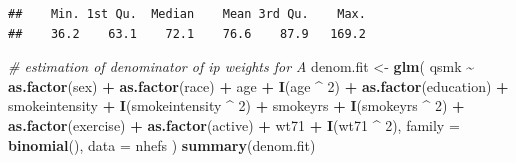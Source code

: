 \documentclass[
  10pt,
]{book}
\newenvironment{Shaded}{\begin{snugshade}}{\end{snugshade}}
\newcommand{\CommentTok}[1]{\textcolor[rgb]{0.56,0.35,0.01}{\textit{#1}}}
\newcommand{\DataTypeTok}[1]{\textcolor[rgb]{0.13,0.29,0.53}{#1}}
\newcommand{\DecValTok}[1]{\textcolor[rgb]{0.00,0.00,0.81}{#1}}
\newcommand{\KeywordTok}[1]{\textcolor[rgb]{0.13,0.29,0.53}{\textbf{#1}}}
\newcommand{\NormalTok}[1]{#1}
\newcommand{\OperatorTok}[1]{\textcolor[rgb]{0.81,0.36,0.00}{\textbf{#1}}}
\newcommand{\StringTok}[1]{\textcolor[rgb]{0.31,0.60,0.02}{#1}}
\begin{document}
\begin{verbatim}
##    Min. 1st Qu.  Median    Mean 3rd Qu.    Max. 
##    36.2    63.1    72.1    76.6    87.9   169.2
\end{verbatim}

\begin{Shaded}
\begin{Highlighting}[]
\CommentTok{\# estimation of denominator of ip weights for A}
\NormalTok{denom.fit \textless{}{-}}
\StringTok{  }\KeywordTok{glm}\NormalTok{(}
\NormalTok{    qsmk }\OperatorTok{\textasciitilde{}}\StringTok{ }\KeywordTok{as.factor}\NormalTok{(sex) }\OperatorTok{+}\StringTok{ }\KeywordTok{as.factor}\NormalTok{(race) }\OperatorTok{+}\StringTok{ }\NormalTok{age }\OperatorTok{+}\StringTok{ }\KeywordTok{I}\NormalTok{(age }\OperatorTok{\^{}}\StringTok{ }\DecValTok{2}\NormalTok{) }\OperatorTok{+}
\StringTok{      }\KeywordTok{as.factor}\NormalTok{(education) }\OperatorTok{+}\StringTok{ }\NormalTok{smokeintensity }\OperatorTok{+}
\StringTok{      }\KeywordTok{I}\NormalTok{(smokeintensity }\OperatorTok{\^{}}\StringTok{ }\DecValTok{2}\NormalTok{) }\OperatorTok{+}\StringTok{ }\NormalTok{smokeyrs }\OperatorTok{+}\StringTok{ }\KeywordTok{I}\NormalTok{(smokeyrs }\OperatorTok{\^{}}\StringTok{ }\DecValTok{2}\NormalTok{) }\OperatorTok{+}
\StringTok{      }\KeywordTok{as.factor}\NormalTok{(exercise) }\OperatorTok{+}\StringTok{ }\KeywordTok{as.factor}\NormalTok{(active) }\OperatorTok{+}\StringTok{ }\NormalTok{wt71 }\OperatorTok{+}\StringTok{ }\KeywordTok{I}\NormalTok{(wt71 }\OperatorTok{\^{}}\StringTok{ }\DecValTok{2}\NormalTok{),}
    \DataTypeTok{family =} \KeywordTok{binomial}\NormalTok{(),}
    \DataTypeTok{data =}\NormalTok{ nhefs}
\NormalTok{  )}
\KeywordTok{summary}\NormalTok{(denom.fit)}
\end{Highlighting}
\end{Shaded}
\end{document}
